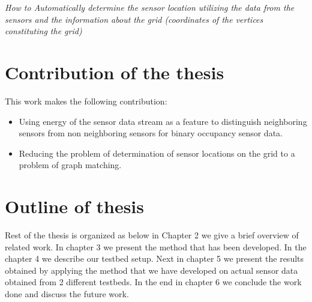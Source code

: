 \textit{How to Automatically determine the sensor location utilizing the data from the sensors and the information about the grid (coordinates of the vertices constituting the grid)}

\section{Contribution of the thesis}
This work makes the following contribution:
\begin{itemize}
\item Using energy of the sensor data stream as a feature to distinguish neighboring sensors from non neighboring sensors for binary occupancy sensor data.
\item Reducing the problem of determination of sensor locations  on the grid to a problem of graph matching.
\end{itemize}

\section{Outline of thesis}

Rest of the thesis is organized as below in Chapter 2 we give a brief overview of related work. In chapter 3 we present the method that has been developed. In the chapter 4 we describe our testbed setup. Next in chapter 5 we present the results obtained by applying the method that we have developed on actual sensor data obtained from 2 different testbeds. In the end in chapter 6 we conclude the work done and discuss the future work.






\vspace{1\baselineskip}

\noindent

